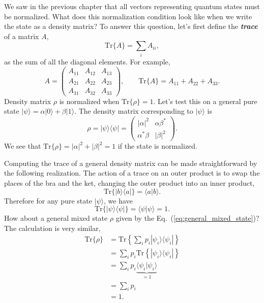 We saw in the previous chapter that all vectors representing quantum states must be normalized.
What does this normalization condition look like when we write the state as a density matrix?
To answer this question, let's first define the \textit{\textbf{trace}} of a matrix $A$,
\begin{equation}
    \text{Tr} \{ A \} = \sum_i A_{ii},
\end{equation}
as the sum of all the diagonal elements.
For example,
\begin{equation}
    A = \begin{pmatrix} A_{11} & A_{12} & A_{13} \\ A_{21} & A_{22} & A_{23} \\ A_{31} & A_{32} & A_{33} \end{pmatrix}, \qquad \text{Tr} \{ A \} = A_{11} + A_{22} + A_{33}.
\end{equation}
Density matrix $\rho$ is normalized when $\text{Tr}\{\rho\}=1$.
Let's test this on a general pure state $|\psi\rangle = \alpha |0\rangle + \beta |1\rangle$.
The density matrix  corresponding to $|\psi\rangle$ is
\begin{equation}
    \rho = |\psi\rangle\langle\psi| = \begin{pmatrix} |\alpha|^2 & \alpha\beta^* \\ \alpha^*\beta & |\beta|^2 \end{pmatrix}.
\end{equation}
We see that $\text{Tr}\{\rho\} = |\alpha|^2 + |\beta|^2 = 1$ if the state is normalized.

Computing the trace of a general density matrix can be made straightforward by the following realization.
The action of a trace on an outer product is to swap the places of the bra and the ket, changing the outer product into an inner product,
\begin{equation}
    \text{Tr} \{|b\rangle\langle a|\} = \langle a|b\rangle.
\end{equation}
Therefore for any pure state $|\psi\rangle$, we have
\begin{equation}
    \text{Tr}\{|\psi\rangle\langle\psi|\} = \langle\psi|\psi\rangle=1.
\end{equation}
How about a general mixed state $\rho$ given by the Eq.~(\ref{eq:general_mixed_state})?
The calculation is very similar,
\begin{align}
    \text{Tr}\{\rho\} & = \text{Tr}\left\{\sum_i p_i |\psi_i\rangle\langle\psi_i|\right\} \\
    & = \sum_i p_i \text{Tr}\left\{ |\psi_i\rangle\langle\psi_i| \right\} \nonumber\\
    & =\sum_i p_i \underbrace{\langle\psi_i|\psi_i\rangle}_{=1} \nonumber\\
    & = \sum_i p_i \nonumber\\
    & = 1.
\end{align}

